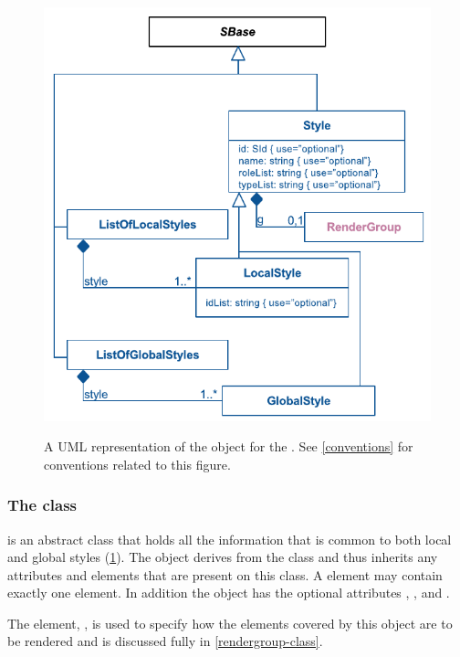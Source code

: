 \begin{figure}[h!]
  \centering
  \includegraphics{images/render-style-uml}\\
  \caption{A UML representation of the \Style object for the \RenderPackage.
	See \ref{conventions} for conventions related to this figure. }
  \label{fig:style_render_uml}
\end{figure}
\subsubsection{The  class}
\label{style-class}

\Style is an abstract class that holds all the information that is common to both local and global styles (\ref{fig:style_render_uml}). The \Style object derives from the \SBase class and thus inherits any
attributes and elements that are present on this class.
A \Style element may contain exactly one \RenderGroup element.
In addition the \Style object has the optional attributes , ,  and .

The \RenderGroup element, , is used to specify how the elements covered by this \Style object are to be rendered and is discussed fully in \ref{rendergroup-class}. 

